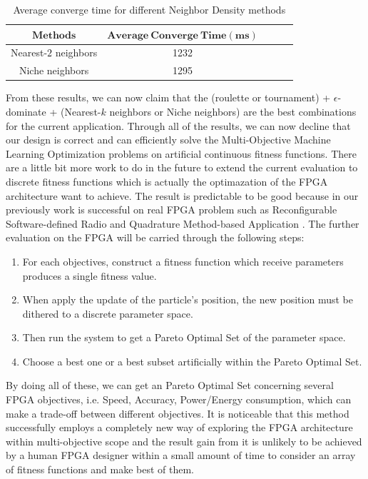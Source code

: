 \documentclass[11pt, runningheads,a4paper]{llncs}
\begin{document}
\begin{table}
\caption {Average converge time for different Neighbor Density methods}\label{tab:compare3}
 \begin{center}
\begin{tabular}{c|cccc} 
\toprule 
	$\mathbf{Methods}$   & $\mathbf{Average\ Converge\ Time (ms)}$\\
	\hline Nearest-$2$ neighbors &  1232 \\ 
         Niche neighbors & 1295 \\
\bottomrule 
\end{tabular} 
\end{center}
\end{table}


From these results, we can now claim that the (roulette or tournament) + $\epsilon$-dominate  + (Nearest-$k$ neighbors or Niche neighbors) are the best combinations for the current application. 
Through all of the results, we can now decline that our design is correct and can efficiently solve the Multi-Objective Machine Learning Optimization problems on artificial continuous fitness functions. There are a little bit more work to do in the future to extend the current evaluation to discrete fitness functions which is actually the optimazation of the FPGA architecture want to achieve. The result is predictable to be good because in our previously work is successful on real FPGA problem such as Reconfigurable Software-defined Radio and Quadrature Method-based Application \cite{arc2012MLO}. The further evaluation on the FPGA will be carried through the following steps:
\begin{enumerate}\addtolength{\itemsep}{-0.1\baselineskip}  
\item For each objectives, construct a fitness function which receive parameters produces a single fitness value.
\item When apply the update of the particle's position, the new position must be dithered to a discrete parameter space.
\item Then run the system to get a Pareto Optimal Set of the parameter space.
\item Choose a best one or a best subset artificially within the Pareto Optimal Set.
\end{enumerate}


By doing all of these, we can get an Pareto Optimal Set concerning several FPGA objectives, i.e. Speed, Accuracy, Power/Energy consumption, which can make a trade-off between different objectives. It is noticeable that this method successfully employs a completely new way of exploring the FPGA architecture within multi-objective scope and the result gain from it is unlikely to be achieved by a human FPGA designer within a small amount of time to consider an array of fitness functions and make best of them.
\end{document}
